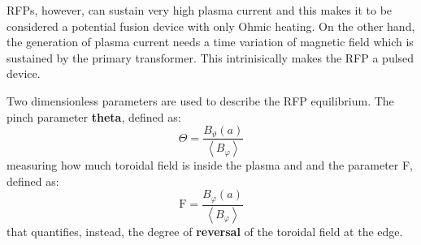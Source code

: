 RFPs, however, can sustain very high plasma current and this makes it to be considered a potential fusion device with only Ohmic heating. On the other hand, the generation of plasma current needs a time variation of magnetic field which is sustained by the primary transformer. This intrinisically makes the RFP a pulsed device.

Two dimensionless parameters are used to describe the RFP equilibrium. 
The pinch parameter \textbf{theta}, defined as:
\begin{equation}
    \Theta = \frac{B_\vartheta (a)}{ \left\langle B_\varphi \right\rangle }
\end{equation}
measuring how much toroidal field is inside the plasma and and the parameter F, defined as:
\begin{equation}
    \mathrm{F} = \frac{B_\varphi(a)}{ \left\langle B_\varphi \right\rangle }
\end{equation}
that quantifies, instead, the degree of \textbf{reversal} of the toroidal field at the edge.

